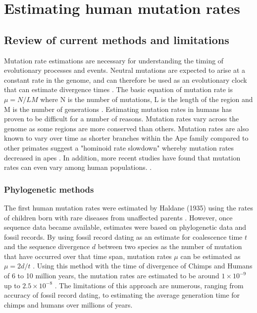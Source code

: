 \documentclass[
11pt, %
oneside, %
english, %
doublespacing, %
headsepline, %
chapterinoneline, %
]{MastersDoctoralThesis} %
\begin{document}
\chapter{Estimating human mutation rates}

\section{Review of current methods and limitations}

Mutation rate estimations are necessary for understanding the timing of evolutionary processes and events.
Neutral mutations are expected to arise at a constant rate in the genome, and can therefore be used as an evolutionary clock that can estimate divergence times \citep{Moorjani2016}. 
The basic equation of mutation rate is $\mu = N / LM$ where N is the number of mutations, L is the length of the region and M is the number of generations \citep{Narasimhan2016}.
Estimating mutation rates in humans has proven to be difficult for a number of reasons.
Mutation rates vary across the genome as some regions are more conserved than others. 
Mutation rates are also known to vary over time as shorter branches within the Ape family compared to other primates suggest a "hominoid rate slowdown" whereby mutation rates decreased in apes \citep{Moorjani2016, Scally2012}.
In addition, more recent studies have found that mutation rates can even vary among human populations. \citep{Harris2015a, Harris2017a}.

\subsection{Phylogenetic methods}
The first human mutation rates were estimated by Haldane (1935) using the rates of children born with rare diseases from unaffected parents \citep{Haldane1935}.
However, once sequence data became available, estimates were based on phylogenetic data and fossil records.
By using fossil record dating as an estimate for coalescence time $t$ and the sequence divergence $d$ between two species as the number of mutation that have occurred over that time span, mutation rates $\mu$ can be estimated as $\mu = 2d/t$ \citep{Scally2012}. 
Using this method with the time of divergence of Chimps and Humans of 6 to 10 million years, the mutation rates are estimated to be around $1\times10^{-9}$ up to $2.5\times10^{-8}$ \citep{Takahata1997, Scally2012, Moorjani2016, Narasimhan2016}.
The limitations of this approach are numerous, ranging from accuracy of fossil record dating, to estimating the average generation time for chimps and humans over millions of years.
\end{document}

